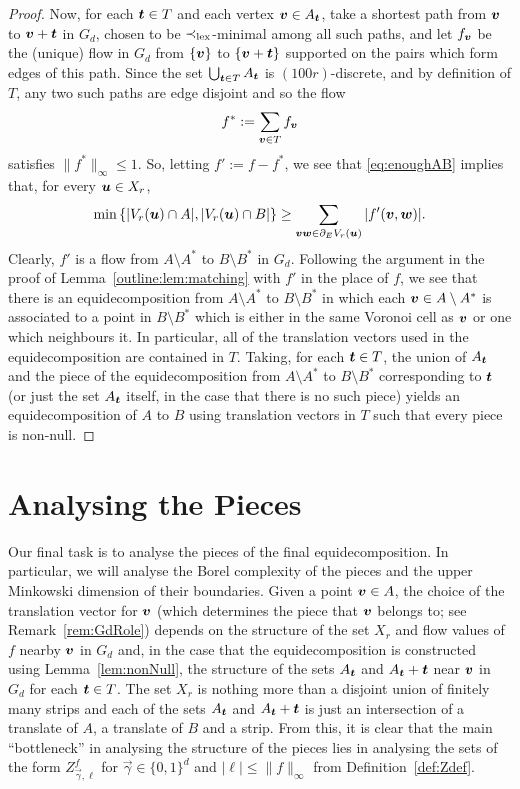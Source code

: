 \documentclass[12pt,a4paper]{amsart}
\numberwithin{equation}{section}
\theoremstyle{definition}
\begin{document}
\begin{proof}
Now, for each $\boldsymbol{t}\in T$ and each vertex $\boldsymbol{v}\in A_{\boldsymbol{t}}$, take a shortest path from $\boldsymbol{v}$ to $\boldsymbol{v}+\boldsymbol{t}$ in $G_d$, chosen to be $\prec_{\operatorname{lex}}$-minimal among all such paths, and let $f_{\boldsymbol{v}}$ be the (unique) flow in $G_d$ from $\{\boldsymbol{v}\}$ to $\{\boldsymbol{v}+\boldsymbol{t}\}$ supported on the pairs which form edges of this path. Since the set $\bigcup_{\boldsymbol{t}\in T}A_{\boldsymbol{t}}$ is $(100r)$-discrete, and by definition of $T$, any two such paths are edge disjoint and so the flow
\[f^*:=\sum_{\boldsymbol{v}\in T}f_{\boldsymbol{v}}\]
satisfies $\|f^*\|_\infty\leq 1$. So, letting $f':= f-f^*$, we see that \eqref{eq:enoughAB} implies that, for every $\boldsymbol{u}\in X_r$,
\[\min\left\{|V_r(\boldsymbol{u})\cap A|,|V_r(\boldsymbol{u})\cap B|\right\}\geq \sum_{\boldsymbol{v}\boldsymbol{w}\in \partial_EV_r(\boldsymbol{u})}|f'(\boldsymbol{v},\boldsymbol{w})|.\]
Clearly, $f'$ is a flow from $A\setminus A^*$ to $B\setminus B^*$ in $G_d$. Following the argument in the proof of Lemma~\ref{outline:lem:matching} with $f'$ in the place of $f$, we see that there is an equidecomposition from $A\setminus A^*$ to $B\setminus B^*$ in which each $\boldsymbol{v}\in A\setminus A^*$ is associated to a point in $B\setminus B^*$ which is either in the same Voronoi cell as $\boldsymbol{v}$ or one which neighbours it. In particular, all of the translation vectors used in the equidecomposition are contained in $T$. Taking, for each $\boldsymbol{t}\in T$, the union of $A_{\boldsymbol{t}}$ and the piece of the equidecomposition from $A\setminus A^*$ to $B\setminus B^*$ corresponding to $\boldsymbol{t}$ (or just the set $A_{\boldsymbol{t}}$ itself, in the case that there is no such piece) yields an equidecomposition of $A$ to $B$ using translation vectors in $T$ such that every piece is non-null.
\end{proof}




\section{Analysing the Pieces}
\label{sec:pieces}

Our final task is to analyse the pieces of the final equidecomposition. In particular, we will analyse the Borel complexity of the pieces and the upper Minkowski dimension of their boundaries. Given a point $\boldsymbol{v}\in A$, the choice of the translation vector for $\boldsymbol{v}$ (which determines the piece that $\boldsymbol{v}$ belongs to; see Remark~\ref{rem:GdRole}) depends on the structure of the set $X_r$ and flow values of $f$ nearby $\boldsymbol{v}$ in $G_d$ and, in the case that the equidecomposition is constructed using Lemma~\ref{lem:nonNull}, the structure of the sets $A_{\boldsymbol{t}}$ and $A_{\boldsymbol{t}}+\boldsymbol{t}$ near $\boldsymbol{v}$ in $G_d$ for each $\boldsymbol{t}\in T$. The set $X_r$ is nothing more than a disjoint union of finitely many strips and each of the sets $A_{\boldsymbol{t}}$ and $A_{\boldsymbol{t}}+\boldsymbol{t}$ is just an intersection of a translate of $A$, a translate of $B$ and a strip. From this, it is clear that the main ``bottleneck'' in analysing the structure of the pieces lies in analysing the sets of the form $Z_{\vec{\gamma},\ell}^f$ for $\vec{\gamma}\in\{0,1\}^d$ and $|\ell|\leq \|f\|_\infty$ from Definition~\ref{def:Zdef}. 
\end{document}
